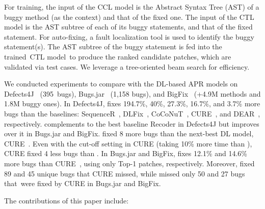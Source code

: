 For training, the input of the CCL model is the Abstract Syntax Tree
(AST) of a buggy method (as the context) and that of the fixed one.
The input of the CTL model is the AST subtree of each of its buggy
statements, and that of the fixed statement. For
auto-fixing, a fault localization tool is used to identify the buggy
statement(s). The AST subtree of the buggy statement is fed into the
trained~CTL model~to produce the ranked candidate patches, which are
validated via test cases. We leverage a tree-oriented beam search for
efficiency.


We conducted experiments to compare {\tool} with the DL-based APR
models on Defects4J~\cite{defects4j} (395~bugs),
Bugs.jar~\cite{saha2018bugs} (1,158 bugs), and
BigFix~\cite{yioopsla19} (+4.9M methods and 1.8M buggy ones).
%
In Defects4J, {\tool} fixes 194.7\%, 40\%, 27.3\%, 16.7\%, and 3.7\%
more bugs than the baselines: SequenceR~\cite{chen2018sequencer},
DLFix~\cite{icse20}, CoCoNuT~\cite{lutellier2020coconut},
CURE~\cite{cure-icse21}, and DEAR~\cite{icse22}, respectively.
{\tool} complements to the best baseline Recoder in Defects4J but
improves over it in Bugs.jar and BigFix.
%
{\tool} fixed 8 more bugs than the next-best DL model, CURE~\cite{cure-icse21}.
%
Even with the cut-off setting in CURE (taking 10\% more time than
{\tool}), CURE fixed 4 less bugs than {\tool}.
%
In Bugs.jar and BigFix, {\tool} fixes 12.1\% and 14.6\% more bugs than
CURE~\cite{cure-icse21}, using only Top-1 patches,
respectively. Moreover, {\tool} fixed 89 and 45 unique bugs that CURE
missed, while {\tool} missed only 50 and 27 bugs that~were fixed by
CURE in Bugs.jar and BigFix.

The contributions of this paper include:



